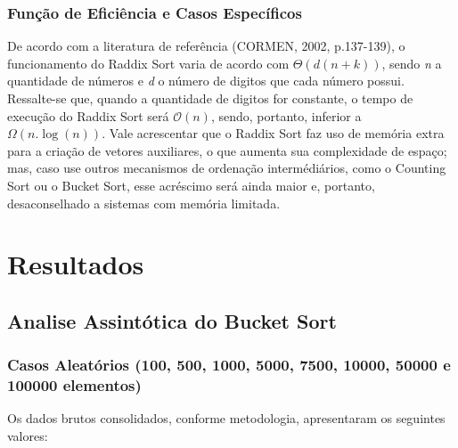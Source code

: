 \documentclass[a4paper, 12pt]{article}
\begin{document}
\subsubsection{Função de Eficiência e Casos Específicos}
\tab{ } De acordo com a literatura de referência (CORMEN, 2002, p.137-139), o funcionamento do Raddix Sort varia de acordo  com $\Theta(d(n+k))$, sendo \textit{n} a quantidade de números e \textit{d} o número de digitos que cada número possui. Ressalte-se que, quando a quantidade de digitos for constante, o tempo de execução do Raddix Sort será $\mathcal{O}(n)$, sendo, portanto, inferior a $\Omega (n.\log(n))$. Vale acrescentar que o Raddix Sort faz uso de memória extra para a criação de vetores auxiliares, o que aumenta sua complexidade de espaço; mas, caso use outros mecanismos de ordenação intermédiários, como o Counting Sort ou o Bucket Sort, esse acréscimo será ainda maior e, portanto, desaconselhado a sistemas com memória limitada. 


\section{Resultados}

\subsection{Analise Assintótica do Bucket Sort}

\subsubsection{Casos Aleatórios (100, 500, 1000, 5000, 7500, 10000, 50000 e 100000 elementos)}

\tab{ }Os dados brutos consolidados, conforme metodologia, apresentaram os seguintes valores:
\vspace{0.3cm}
\end{document}

